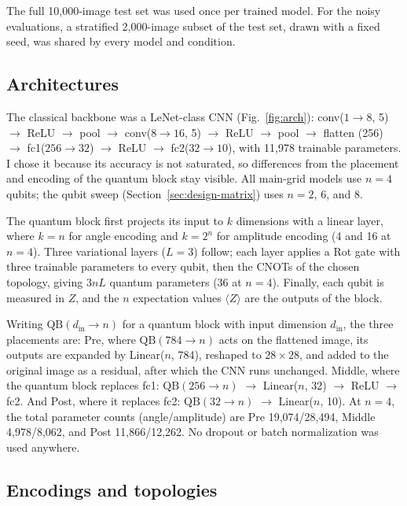 \documentclass{ieeeaccess}
\begin{document}
The full 10,000-image test set was used once per trained model. For the noisy evaluations, a stratified 2,000-image subset of the test set, drawn with a fixed seed, was shared by every model and condition.

\subsection{Architectures}
\label{sec:design-arch}

The classical backbone was a LeNet-class CNN \cite{lecun1998gradient} (Fig.~\ref{fig:arch}): conv($1\rightarrow8$, 5) $\rightarrow$ ReLU $\rightarrow$ pool $\rightarrow$ conv($8\rightarrow16$, 5) $\rightarrow$ ReLU $\rightarrow$ pool $\rightarrow$ flatten (256) $\rightarrow$ fc1($256\rightarrow32$) $\rightarrow$ ReLU $\rightarrow$ fc2($32\rightarrow10$), with 11,978 trainable parameters. I chose it because its accuracy is not saturated, so differences from the placement and encoding of the quantum block stay visible. All main-grid models use $n = 4$ qubits; the qubit sweep (Section~\ref{sec:design-matrix}) uses $n = 2$, 6, and 8.

The quantum block first projects its input to $k$ dimensions with a linear layer, where $k = n$ for angle encoding and $k = 2^n$ for amplitude encoding (4 and 16 at $n = 4$). Three variational layers ($L = 3$) follow; each layer applies a Rot gate with three trainable parameters to every qubit, then the CNOTs of the chosen topology, giving $3nL$ quantum parameters (36 at $n = 4$). Finally, each qubit is measured in $Z$, and the $n$ expectation values $\langle Z\rangle$ are the outputs of the block.

Writing $\mathrm{QB}(d_{\mathrm{in}}\rightarrow n)$ for a quantum block with input dimension $d_{\mathrm{in}}$, the three placements are: Pre, where $\mathrm{QB}(784\rightarrow n)$ acts on the flattened image, its outputs are expanded by Linear($n$, 784), reshaped to $28\times28$, and added to the original image as a residual, after which the CNN runs unchanged. Middle, where the quantum block replaces fc1: $\mathrm{QB}(256\rightarrow n)$ $\rightarrow$ Linear($n$, 32) $\rightarrow$ ReLU $\rightarrow$ fc2. And Post, where it replaces fc2: $\mathrm{QB}(32\rightarrow n)$ $\rightarrow$ Linear($n$, 10). At $n = 4$, the total parameter counts (angle/amplitude) are Pre 19,074/28,494, Middle 4,978/8,062, and Post 11,866/12,262. No dropout or batch normalization was used anywhere.

\subsection{Encodings and topologies}
\label{sec:design-topo}
\end{document}
